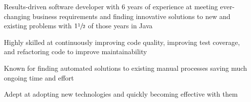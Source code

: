 %
    \begin{itemize*}
        \item Results-driven software developer with 6 years of experience at meeting ever-changing business requirements
            and finding innovative solutions to new and existing problems with \(1\sfrac{1}{2}\) of those years in Java
        \item Highly skilled at continuously improving code quality, improving test coverage, and refactoring code to improve maintainability
        \item Known for finding automated solutions to existing manual processes saving much ongoing time and effort
        \item Adept at adopting new technologies and quickly becoming effective with them
    \end{itemize*}
